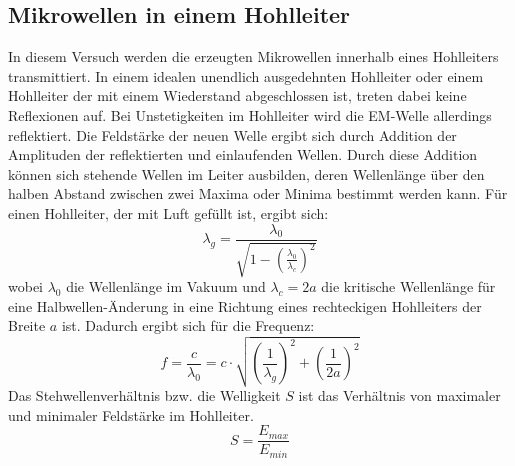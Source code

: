     \subsection{Mikrowellen in einem Hohlleiter}
    \label{sec:Hohlleiter}
        In diesem Versuch werden die erzeugten Mikrowellen innerhalb eines Hohlleiters transmittiert.
        In einem idealen unendlich ausgedehnten Hohlleiter oder einem Hohlleiter der mit einem Wiederstand abgeschlossen ist, treten dabei keine Reflexionen auf.
        Bei Unstetigkeiten im Hohlleiter wird die EM-Welle allerdings reflektiert. 
        Die Feldstärke der neuen Welle ergibt sich durch Addition der Amplituden der reflektierten und einlaufenden Wellen.
        Durch diese Addition können sich stehende Wellen im Leiter ausbilden, deren Wellenlänge über den halben Abstand zwischen zwei Maxima oder Minima bestimmt werden kann.
        Für einen Hohlleiter, der mit Luft gefüllt ist, ergibt sich:
        \begin{equation}
            \lambda_g = \frac{\lambda_0}{\sqrt{1-\left(\frac{\lambda_0}{\lambda_c}\right)^2}}
        \end{equation}
        wobei $\lambda_0$ die Wellenlänge im Vakuum und $\lambda_c = 2a$ die kritische Wellenlänge für eine Halbwellen-Änderung in eine Richtung eines rechteckigen Hohlleiters der Breite $a$ ist.
        Dadurch ergibt sich für die Frequenz:
        \begin{equation}
            \label{eqn:frequenz}
            f = \frac{c}{\lambda_0} = c \cdot \sqrt{\left(\frac{1}{\lambda_g}\right)^2 + \left(\frac{1}{2a}\right)^2}
        \end{equation}
        Das Stehwellenverhältnis bzw. die Welligkeit $S$ ist das Verhältnis von maximaler und minimaler Feldstärke im Hohlleiter.
        \begin{equation}
            S = \frac{E_{max}}{E_{min}}
        \end{equation}